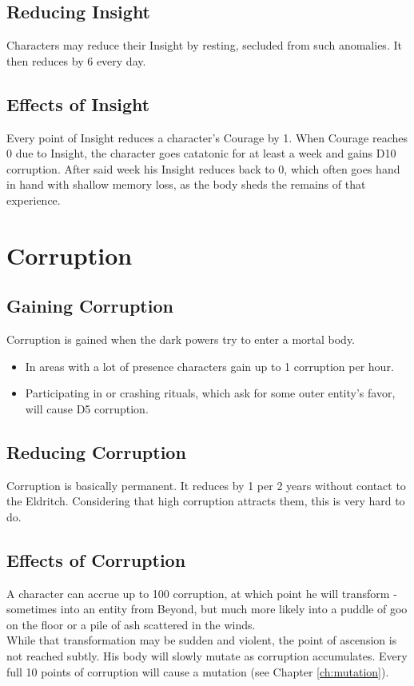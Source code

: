 \documentclass[12pt,a4paper,openany]{book}
\begin{document}
	\subsection{Reducing Insight}
	Characters may reduce their Insight by resting,
		secluded from such anomalies.
	It then reduces by 6 every day.
	\subsection{Effects of Insight}
	Every point of Insight reduces a character's Courage by 1.
	When Courage reaches 0 due to Insight,
		the character goes catatonic for at least a week and gains D10 corruption.
	After said week his Insight reduces back to 0,
		which often goes hand in hand with shallow memory loss,
		as the body sheds the remains of that experience.
	
	\section{Corruption}
	\subsection{Gaining Corruption}
	Corruption is gained when the dark powers try to enter a mortal body.
	\vspace{-8mm}
	\begin{itemize}
		\setlength\itemsep{-8mm}
		\item In areas with a lot of presence characters gain up to 1 corruption per hour.
		\item Participating in or crashing rituals, which ask for some outer entity's favor, will cause D5 corruption.
	\end{itemize}
	\subsection{Reducing Corruption}
	Corruption is basically permanent.
	It reduces by 1 per 2 years without contact to the Eldritch.
	Considering that high corruption attracts them, this is very hard to do.
	\subsection{Effects of Corruption}
	A character can accrue up to 100 corruption, at which point he will transform
		- sometimes into an entity from Beyond,
		but much more likely into
		a puddle of goo on the floor
		or a pile of ash scattered in the winds.
		\\%
	While that transformation may be sudden and violent,
		the point of ascension is not reached subtly.
	His body will slowly mutate as corruption accumulates.
	Every full 10 points of corruption will cause a mutation (see Chapter \ref{ch:mutation}).
	
\end{document}
